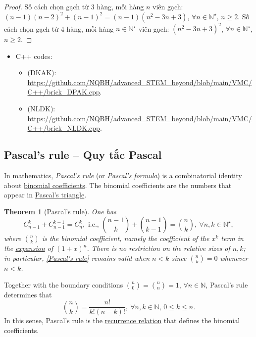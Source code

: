 \documentclass{article}
\newtheorem{theorem}{Theorem}
\begin{document}
\begin{proof}
	Số cách chọn gạch từ 3 hàng, mỗi hàng $n$ viên gạch: $(n - 1)(n - 2)^2 + (n - 1)^2 = (n - 1)(n^2 - 3n + 3)$, $\forall n\in\mathbb{N}^\star$, $n\ge2$. Số cách chọn gạch từ 4 hàng, mỗi hàng $n\in\mathbb{N}^\star$ viên gạch: $(n^2 - 3n + 3)^2$, $\forall n\in\mathbb{N}^\star$, $n\ge2$.
\end{proof}

\begin{itemize}
	\item C++ codes:
	\begin{itemize}
		\item (DKAK): \url{https://github.com/NQBH/advanced_STEM_beyond/blob/main/VMC/C++/brick_DPAK.cpp}.
		\item (NLDK): \url{https://github.com/NQBH/advanced_STEM_beyond/blob/main/VMC/C++/brick_NLDK.cpp}.
	\end{itemize}
\end{itemize}

\subsection{Pascal's rule -- Quy tắc Pascal}
In mathematics, {\it Pascal's rule} (or {\it Pascal's formula}) is a combinatorial identity about \href{https://en.wikipedia.org/wiki/Binomial_coefficient}{binomial coefficients}. The binomial coefficients are the numbers that appear in \href{https://en.wikipedia.org/wiki/Pascal%27s_triangle}{Pascal's triangle}.

\begin{theorem}[Pascal's rule]
	One has
	\begin{equation}
		\label{Pascal's rule}
		\tag{Pasr}
		C_{n-1}^k + C_{n-1}^{k-1} = C_n^k,\mbox{ i.e., }\binom{n - 1}{k} + \binom{n - 1}{k - 1} = \binom{n}{k},\ \forall n,k\in\mathbb{N}^\star,
	\end{equation}
	where $\binom{n}{k}$ is the binomial coefficient, namely the coefficient of the $x^k$ term in the \href{https://en.wikipedia.org/wiki/Polynomial_expansion}{expansion} of $(1 + x)^n$. There is no restriction on the relative sizes of $n,k$; in particular, \eqref{Pascal's rule} remains valid when $n < k$ since $\binom{n}{k} = 0$ whenever $n < k$.
\end{theorem}
Together with the boundary conditions $\binom{n}{0} = \binom{n}{n} = 1$, $\forall n\in\mathbb{N}$, Pascal's rule determines that
\begin{equation*}
	\binom{n}{k} = \frac{n!}{k!(n - k)!},\ \forall n,k\in\mathbb{N},\,0\le k\le n.
\end{equation*}
In this sense, Pascal's rule is the \href{https://en.wikipedia.org/wiki/Recurrence_relation}{recurrence relation} that defines the binomial coefficients.
\end{document}
